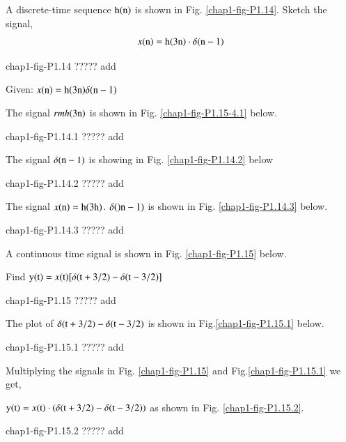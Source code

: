 \begin{example}
A discrete-time sequence $\textrm{h}(\textrm{n})$ is shown in Fig. \ref{chap1-fig-P1.14}. Sketch the signal,
$$
x{(\textrm{n})} = \textrm{h}(3\textrm{n})\cdot \delta(\textrm{n}-1)
$$
\begin{center}
chap1-fig-P1.14 ????? add
\end{center}
\end{example}

\begin{solution}
Given: $x(\textrm{n})= \textrm{h}(3\textrm{n}) \delta(\textrm{n}-1)$

The signal $rmh(3 \textrm{n})$ is shown in Fig. \ref{chap1-fig-P1.15-4.1} below.
\begin{center}
chap1-fig-P1.14.1 ????? add
\end{center}


The signal $\delta(\textrm{n}-1)$ is showing in Fig. \ref{chap1-fig-P1.14.2} below
\begin{center}
chap1-fig-P1.14.2 ????? add
\end{center}

The signal $x(\textrm{n})=\textrm{h}(3\textrm{h})$. $\delta()\textrm{n}-1)$ is shown in Fig. \ref{chap1-fig-P1.14.3} below.
\begin{center}
chap1-fig-P1.14.3 ????? add
\end{center} 
\end{solution}

\begin{example}\label{chap1-example-1.15}
A continuous time signal is shown in Fig. \ref{chap1-fig-P1.15} below.

Find ${\textrm{y}(\textrm{t})} = x{(\textrm{t})}[\delta(\textrm{t} + 3/2) -\delta(\textrm{t}-3/2)]$
\begin{center}
chap1-fig-P1.15 ????? add
\end{center} 
\end{example}

\begin{solution}
The plot of $\delta(\textrm{t} + 3/2)-\delta(\textrm{t}-3/2)$ is shown in Fig.\ref{chap1-fig-P1.15.1} below.
\begin{center}
chap1-fig-P1.15.1 ????? add
\end{center} 

Multiplying the signals in  Fig. \ref{chap1-fig-P1.15} and Fig.\ref{chap1-fig-P1.15.1} we get,

${\textrm{y}(\textrm{t})} = x(\textrm{t})\cdot(\delta(\textrm{t} + 3/2) -\delta(\textrm{t} -3/2))$ as shown in Fig. \ref{chap1-fig-P1.15.2}.
\begin{center}
chap1-fig-P1.15.2 ????? add
\end{center}


\end{solution}

\label{1end}
